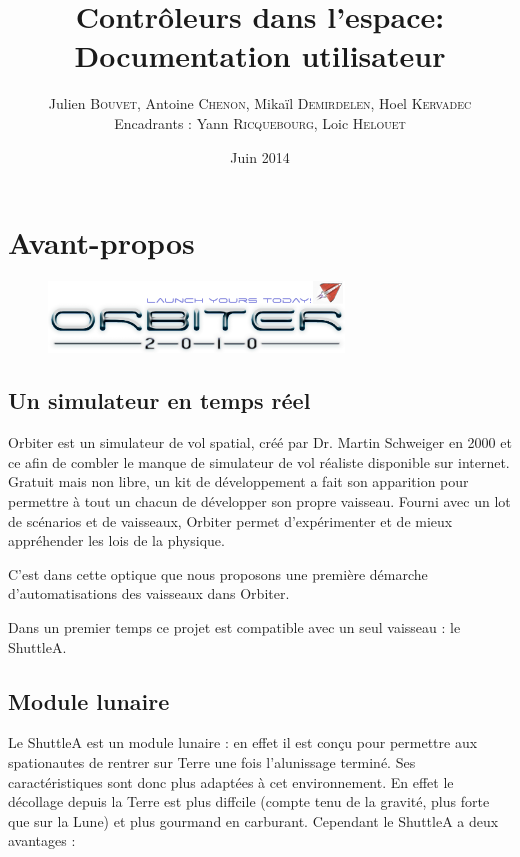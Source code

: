 \documentclass[a4paper,11pt]{article}
\title{\textbf{Contrôleurs dans l'espace: Documentation utilisateur}}
\author{Julien \textsc{Bouvet}, Antoine \textsc{Chenon}, Mikaïl \textsc{Demirdelen}, Hoel \textsc{Kervadec}
        \\
        Encadrants : Yann \textsc{Ricquebourg}, Loic \textsc{Helouet}}
\date{Juin 2014}
\begin{document}
          
\onehalfspacing
\maketitle
\section{Avant-propos}

\begin{figure}[!h]
            \begin{center}
                \includegraphics[width=0.7\textwidth]{img/orbiter_logo.png}
            \end{center}
\end{figure}

\subsection{Un simulateur en temps réel}

Orbiter est un simulateur de vol spatial, créé par Dr. Martin Schweiger en 2000 et ce afin de combler le manque de simulateur de vol réaliste disponible sur internet. Gratuit mais non libre, un kit de développement a fait son apparition pour permettre à tout un chacun de développer son propre vaisseau. Fourni avec un lot de scénarios et de vaisseaux, Orbiter permet d'expérimenter et de mieux appréhender les lois de la physique.

C'est dans cette optique que nous proposons une première démarche d'automatisations des vaisseaux dans Orbiter.

Dans un premier temps ce projet est compatible avec un seul vaisseau : le ShuttleA.

\subsection{Module lunaire}

Le ShuttleA est un module lunaire : en effet il est conçu pour permettre aux spationautes de rentrer sur Terre une fois l'alunissage terminé. Ses caractéristiques sont donc plus adaptées à cet environnement. En effet le décollage depuis la Terre est plus diffcile (compte tenu de la gravité, plus forte que sur la Lune) et plus gourmand en carburant. Cependant le ShuttleA a deux avantages :
\end{document}
